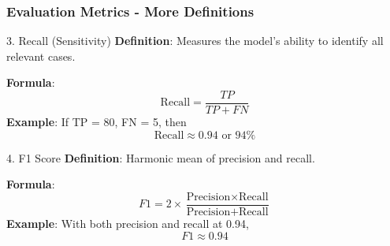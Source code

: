 \documentclass{beamer}
\begin{document}
\begin{frame}[fragile]
    \frametitle{Evaluation Metrics - More Definitions}
    \begin{block}{3. Recall (Sensitivity)}
        \textbf{Definition}: Measures the model's ability to identify all relevant cases.
        
        \textbf{Formula}:
        \begin{equation}
            \text{Recall} = \frac{TP}{TP + FN}
        \end{equation}
        \textbf{Example}:
        If TP = 80, FN = 5, then
        \begin{equation}
            \text{Recall} \approx 0.94 \text{ or } 94\%
        \end{equation}
    \end{block}
    
    \begin{block}{4. F1 Score}
        \textbf{Definition}: Harmonic mean of precision and recall.
        
        \textbf{Formula}:
        \begin{equation}
            F1 = 2 \times \frac{\text{Precision} \times \text{Recall}}{\text{Precision} + \text{Recall}}
        \end{equation}
        \textbf{Example}: 
        With both precision and recall at 0.94,
        \begin{equation}
            F1 \approx 0.94
        \end{equation}
    \end{block}
\end{frame}
\end{document}
